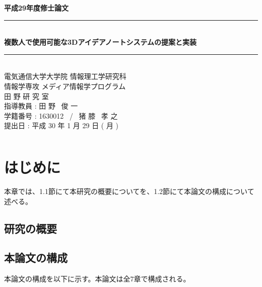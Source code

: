 \documentclass[11pt,a4j, titlepage]{jarticle} %
\begin{document}
\begin{titlepage}
	\begin{center}
		\vspace{8ex}
		{\Large \bf 平成29年度修士論文}
		\vspace{3ex}\\
		\rule{\hsize}{2mm}
		\vspace{1mm}\\ 
		{\LARGE \bf 複数人で使用可能な3Dアイデアノートシステムの提案と実装} 
		\vspace{6mm}\\ 
		\rule{\hsize}{2mm} 
		\vspace{2.5cm} \\ 
		{\Large 電気通信大学大学院 情報理工学研究科 \\ 
		情報学専攻 メディア情報学プログラム} 
		\vspace{2ex} \\ 
		\renewcommand{\thefootnote}{\fnsymbol{footnote}} 
		{\Large 田 野 研 究 室} 
		\vspace{3ex} \\ 
		{\Large 指導教員 : 田 野 \ 俊 一} 
		\vspace{3ex} \\
		{\Large 学籍番号 : 1630012 \ / \ 猪 膝 \ 孝 之} 
		\vspace{5ex} \\ 
		{\Large 提出日 : 平成 30 年 1 月 29 日 ( 月 )} 
		\vspace{-5ex} \\ 
		\begin{verbatim} 
		\end{verbatim} 
	\end{center} 
\end{titlepage}

\tableofcontents
\newpage
\listoffigures
\newpage
\listoftables
\newpage
\section{はじめに}
本章では、1.1節にて本研究の概要についてを、1.2節にて本論文の構成について述べる。

\subsection{研究の概要}


\subsection{本論文の構成}
本論文の構成を以下に示す。本論文は全7章で構成される。
\end{document}

